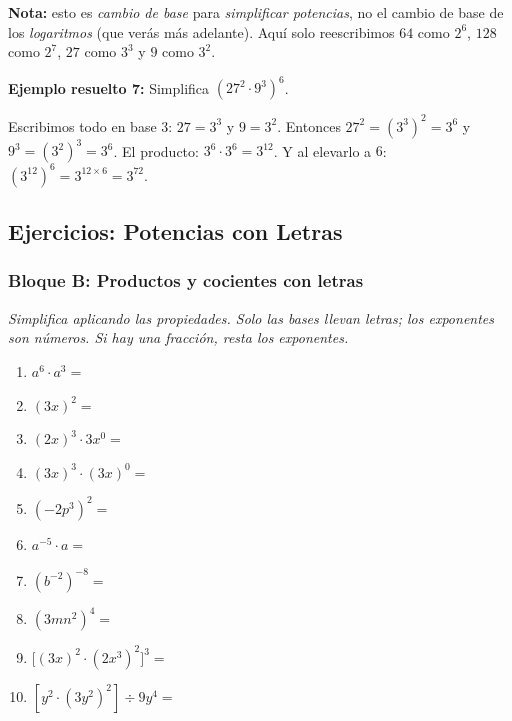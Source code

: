 \documentclass[12pt, letterpaper]{article}
\begin{document}
\begin{cuadroadvertencia}
  \textbf{Nota:} esto es \emph{cambio de base} para \emph{simplificar potencias}, no el cambio de base de los \emph{logaritmos} (que verás más adelante). Aquí solo reescribimos $64$ como $2^6$, $128$ como $2^7$, $27$ como $3^3$ y $9$ como $3^2$.
\end{cuadroadvertencia}

\noindent\textbf{Ejemplo resuelto 7:} Simplifica $(27^2 \cdot 9^3)^6$.

Escribimos todo en base $3$: $27 = 3^3$ y $9 = 3^2$. Entonces $27^2 = (3^3)^2 = 3^6$ y $9^3 = (3^2)^3 = 3^6$. El producto: $3^6 \cdot 3^6 = 3^{12}$. Y al elevarlo a $6$: $(3^{12})^6 = 3^{12 \times 6} = 3^{72}$.

\subsection{Ejercicios: Potencias con Letras}

\subsubsection*{Bloque B: Productos y cocientes con letras}
\textit{Simplifica aplicando las propiedades. Solo las bases llevan letras; los exponentes son números. Si hay una fracción, resta los exponentes.}

\begin{enumerate}[leftmargin=*, start=122]
  \item \facil{} $a^6 \cdot a^3 =$

  \item \facil{} $(3x)^2 =$

  \item \medio{} $(2x)^3 \cdot 3x^0 =$

  \item \medio{} $(3x)^3 \cdot (3x)^0 =$

  \item \medio{} $(-2p^3)^2 =$

  \item \medio{} $a^{-5} \cdot a =$

  \item \medio{} $(b^{-2})^{-8} =$

  \item \medio{} $(3mn^2)^4 =$

  \item \dificil{} $\big[(3x)^2 \cdot (2x^3)^2\big]^3 =$

  \item \medio{} $\left[y^2 \cdot (3y^2)^2\right] \div 9y^4 =$
\end{enumerate}
\end{document}

